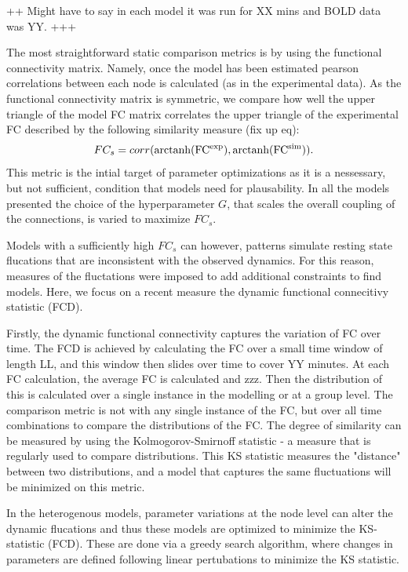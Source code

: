 \documentclass[oneside]{zHenriquesLab-StyleBioRxiv}
\begin{document}
++ Might have to say in each model it was run for XX mins and BOLD data was YY. +++ 

The most straightforward static comparison metrics is by using the functional connectivity matrix. Namely, once the model has been estimated pearson correlations between each node is calculated (as in the experimental data). As the functional connectivity matrix is symmetric, we compare how well the upper triangle of the model FC matrix correlates the upper triangle of the experimental FC described by the following similarity measure (fix up eq):
\begin{equation}
	FC_{s} = corr({\rm arctanh(FC^{exp}}),{\rm arctanh(FC^{sim}})).
\end{equation}
This metric is the intial target of parameter optimizations as it is a nessessary, but not sufficient, condition that models need for plausability. In all the models presented the choice of the hyperparameter $G$, that scales the overall coupling of the connections, is varied to maximize $FC_s$.  

Models with a sufficiently high $FC_s$ can however, patterns simulate resting state flucations that are inconsistent with the observed dynamics. For this reason, measures of the fluctations were imposed to add additional constraints to find models. Here, we focus on a recent measure the dynamic functional connecitivy statistic (FCD).

Firstly, the dynamic functional connectivity captures the variation of FC over time. The FCD is achieved by calculating the FC over a small time window of length LL, and this window then slides over time to cover YY minutes. At each FC calculation, the average FC is calculated and zzz. Then the distribution of this is calculated over a single instance in the modelling or at a group level. The comparison metric is not with any single instance of the FC, but over all time combinations to compare the distributions of the FC. The degree of similarity can be measured by using the Kolmogorov-Smirnoff statistic - a measure that is regularly used to compare distributions. This KS statistic measures the "distance" between two distributions, and a model that captures the same fluctuations will be minimized on this metric. 

In the heterogenous models, parameter variations at the node level can alter the dynamic flucations and thus these models are optimized to minimize the KS-statistic (FCD). These are done via a greedy search algorithm, where changes in parameters are defined following linear pertubations to minimize the KS statistic. 
\end{document}
